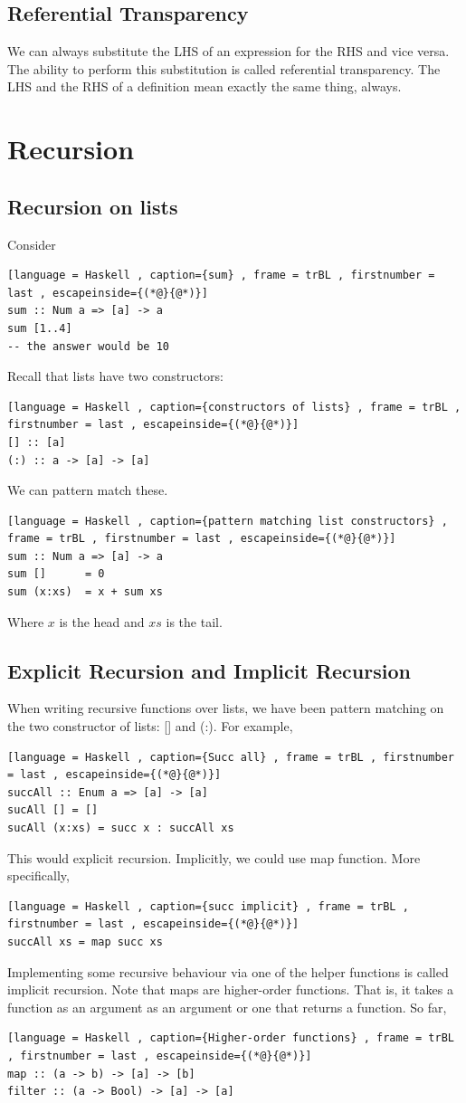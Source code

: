 \documentclass[a4paper]{article}
\theoremstyle{plain}
\theoremstyle{definition}
\theoremstyle{remark}
\begin{document}
\subsection{Referential Transparency}
We can always substitute the LHS of an expression for the RHS and vice versa. The ability to perform this substitution is called referential transparency. The LHS and the RHS of a definition mean exactly the same thing, always. 
\section{Recursion}
\subsection{Recursion on lists}
Consider
\begin{lstlisting}[language = Haskell , caption={sum} , frame = trBL , firstnumber = last , escapeinside={(*@}{@*)}]
sum :: Num a => [a] -> a
sum [1..4]
-- the answer would be 10
\end{lstlisting}
Recall that lists have two constructors:
\begin{lstlisting}[language = Haskell , caption={constructors of lists} , frame = trBL , firstnumber = last , escapeinside={(*@}{@*)}]
[] :: [a]
(:) :: a -> [a] -> [a]
\end{lstlisting}
We can pattern match these.
\begin{lstlisting}[language = Haskell , caption={pattern matching list constructors} , frame = trBL , firstnumber = last , escapeinside={(*@}{@*)}]
sum :: Num a => [a] -> a
sum []		= 0
sum (x:xs)	= x + sum xs
\end{lstlisting}
Where $x$ is the head and $xs$ is the tail.
\subsection{Explicit Recursion and Implicit Recursion} 
When writing recursive functions over lists, we have been pattern matching on the two constructor of lists: [] and (:).  For example,
\begin{lstlisting}[language = Haskell , caption={Succ all} , frame = trBL , firstnumber = last , escapeinside={(*@}{@*)}]
succAll :: Enum a => [a] -> [a]
sucAll [] = []
sucAll (x:xs) = succ x : succAll xs
\end{lstlisting}
This would explicit recursion. Implicitly, we could use map function. More specifically,
\begin{lstlisting}[language = Haskell , caption={succ implicit} , frame = trBL , firstnumber = last , escapeinside={(*@}{@*)}]
succAll xs = map succ xs
\end{lstlisting}
Implementing some recursive behaviour via one of the helper functions is called implicit recursion.
Note that maps are higher-order functions. That is, it takes a function as an argument as an argument or one that returns a function. So far,
\begin{lstlisting}[language = Haskell , caption={Higher-order functions} , frame = trBL , firstnumber = last , escapeinside={(*@}{@*)}]
map :: (a -> b) -> [a] -> [b]
filter :: (a -> Bool) -> [a] -> [a]
\end{lstlisting}
\end{document}
